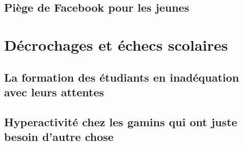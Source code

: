 \subsection{Piège de Facebook pour les jeunes}



\section{Décrochages et échecs scolaires}
\subsection{La formation des étudiants en inadéquation avec leurs attentes}


\subsection{Hyperactivité chez les gamins qui ont juste besoin d'autre chose}


